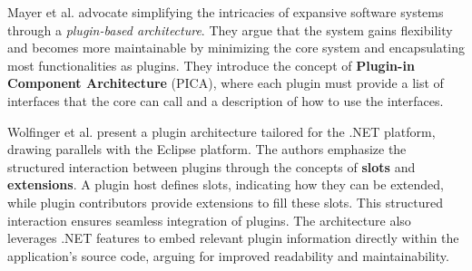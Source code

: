 \documentclass[
  a4paper,  %
  twoside,  %
  bibliography=totoc,
  headsepline,
  cleardoublepage=empty,
  parskip=half,
  draft=false
]{scrbook}
\begin{document}
Mayer et al. \cite{Mayer_2003} advocate simplifying the intricacies of expansive software systems through a \emph{plugin-based architecture}.
They argue that the system gains flexibility and becomes more maintainable by minimizing the core system and encapsulating most functionalities as plugins.
They introduce the concept of \textbf{Plugin-in Component Architecture} (PICA), where each plugin must provide a list of interfaces that the core can call and a description of how to use the interfaces.

Wolfinger et al. \cite{Wolfinger2006} present a plugin architecture tailored for the .NET platform, drawing parallels with the Eclipse platform.
The authors emphasize the structured interaction between plugins through the concepts of \textbf{slots} and \textbf{extensions}.
A plugin host defines slots, indicating how they can be extended, while plugin contributors provide extensions to fill these slots.
This structured interaction ensures seamless integration of plugins.
The architecture also leverages .NET features to embed relevant plugin information directly within the application's source code, arguing for improved readability and maintainability.
\end{document}
